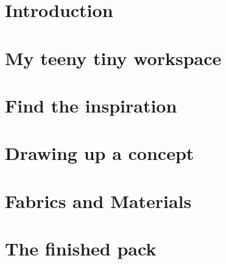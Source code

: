 \chapter{Introduction} \label{chap:intro}


\chapter{My teeny tiny workspace} \label{chap:workspace}


\chapter{Find the inspiration} \label{chap:inspiration}


\chapter{Drawing up a concept} \label{chap:drawing}


\chapter{Fabrics and Materials} \label{chap:materials}


\chapter{The finished pack} \label{chap:pack}

